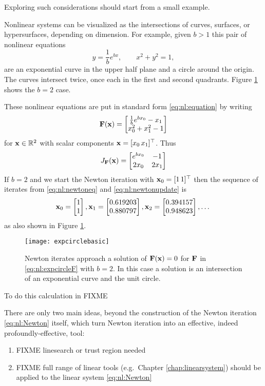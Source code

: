 Exploring such considerations should start from a small example.

\medskip\noindent\hrulefill
\begin{example}  Nonlinear systems can be visualized as the intersections of curves, surfaces, or hypersurfaces, depending on dimension.  For example, given $b > 1$ this pair of nonlinear equations
    $$y = \frac{1}{b} e^{bx}, \qquad x^2+y^2 = 1,$$
are an exponential curve in the upper half plane and a circle around the origin.  The curves intersect twice, once each in the first and second quadrants.  Figure \ref{fig:expcirclebasic} shows the $b=2$ case. 

These nonlinear equations are put in standard form \eqref{eq:nl:equation} by writing
\begin{equation}
\label{eq:nl:expcircleF}
\mathbf{F}(\mathbf{x}) = \begin{bmatrix}
           \frac{1}{b} e^{b x_0} - x_1 \\
           x_0^2 + x_1^2 - 1
           \end{bmatrix}
\end{equation}
for $\mathbf{x}\in \mathbb{R}^2$ with scalar components $\mathbf{x} = [x_0 \, x_1]^\top$.  Thus
\begin{equation}
J_{\mathbf{F}}(\mathbf{x}) = \begin{bmatrix}
    e^{b x_0} & -1 \\
    2 x_0   & 2 x_1 \end{bmatrix}
\end{equation}
If $b=2$ and we start the Newton iteration with $\mathbf{x}_0 = [1 \, 1]^\top$ then the sequence of iterates from \eqref{eq:nl:newtoneq} and \eqref{eq:nl:newtonupdate} is
    $${\mathbf{x}}_{0} = \begin{bmatrix} 1 \\ 1 \end{bmatrix}, {\mathbf{x}}_{1} = \begin{bmatrix} 0.619203 \\ 0.880797 \end{bmatrix}, {\mathbf{x}}_{2} = \begin{bmatrix} 0.394157 \\ 0.948623 \end{bmatrix}, \dots$$
as also shown in Figure \ref{fig:expcirclebasic}.
\end{example}
\noindent\hrulefill

\medskip
\begin{figure}
\bigskip
\texttt{[image: expcirclebasic]}
\caption{Newton iterates approach a solution of $\mathbf{F}(\mathbf{x})=0$ for $\mathbf{F}$ in \eqref{eq:nl:expcircleF} with $b=2$.  In this case a solution is an intersection of an exponential curve and the unit circle.}
\label{fig:expcirclebasic}
\end{figure}

To do this calculation in \PETSc FIXME

There are only two main ideas, beyond the construction of the Newton iteration \eqref{eq:nl:Newton} itself, which turn Newton iteration into an effective, indeed profoundly-effective, tool:
\renewcommand{\labelenumi}{\roman{enumi})}
\begin{enumerate}
\item FIXME linesearch or trust region needed \citep{Kelley2003}
\item FIXME full range of linear tools (e.g.~Chapter \ref{chap:linearsystem}) should be applied to the linear system \eqref{eq:nl:Newton}
\end{enumerate}

